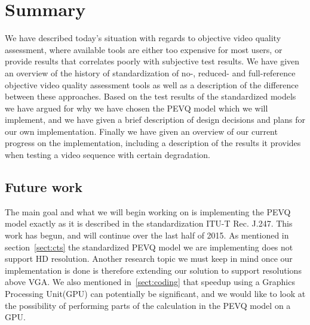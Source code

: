\section{Summary}\label{sect:summary}
We have described today's situation with regards to objective video quality assessment, where available tools are either too expensive for most users, or provide results that correlates poorly with subjective test results. We have given an overview of the history of standardization of no-, reduced- and full-reference objective video quality assessment tools as well as a description of the difference between these approaches. Based on the test results of the standardized models we have argued for why we have chosen the PEVQ model which we will implement, and we have given a brief description of design decisions and plans for our own implementation. Finally we have given an overview of our current progress on the implementation, including a description of the results it provides when testing a video sequence with certain degradation.

\subsection{Future work}\label{sect:future work}
The main goal and what we will begin working on is implementing the PEVQ model exactly as it is described in the standardization ITU-T Rec. J.247. This work has begun, and will continue over the last half of 2015. As mentioned in section~\ref{sect:cts} the standardized PEVQ model we are implementing does not support HD resolution. Another research topic we must keep in mind once our implementation is done is therefore extending our solution to support resolutions above VGA. We also mentioned in~\ref{sect:coding} that speedup using a Graphics Processing Unit(GPU) can potentially be significant, and we would like to look at the possibility of performing parts of the calculation in the PEVQ model on a GPU.
